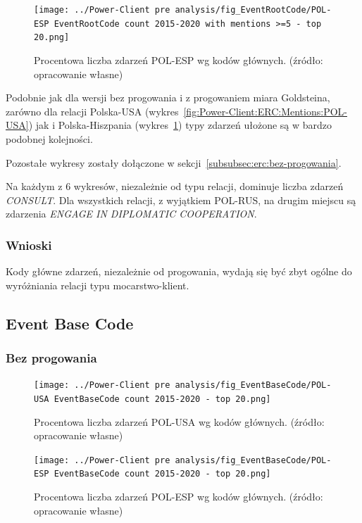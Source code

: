 \documentclass[11pt]{report}
\begin{document}
    \begin{figure}[!htp]
        \centering
        \texttt{[image: ../Power-Client pre analysis/fig\_EventRootCode/POL-ESP EventRootCode count 2015-2020 with mentions >=5 - top 20.png]}
        \caption{Procentowa liczba zdarzeń POL-ESP wg kodów głównych. (źródło: opracowanie własne)}
        \label{fig:Power-Client:ERC:Mentions:POL-ESP}
    \end{figure}

    Podobnie jak dla wersji bez progowania i z progowaniem miara Goldsteina, zarówno dla relacji Polska-USA (wykres~\ref{fig:Power-Client:ERC:Mentions:POL-USA}) jak i Polska-Hiszpania (wykres~\ref{fig:Power-Client:ERC:Mentions:POL-ESP})
    typy zdarzeń ułożone są w bardzo podobnej kolejności.

    Pozostałe wykresy zostały dołączone w sekcji~\ref{subsubsec:erc:bez-progowania}.

    Na każdym z 6 wykresów, niezależnie od typu relacji, dominuje liczba zdarzeń \textit{CONSULT}.
    Dla wszystkich relacji, z wyjątkiem POL-RUS, na drugim miejscu są zdarzenia \textit{ENGAGE IN DIPLOMATIC COOPERATION}.

    \subsubsection{Wnioski}
    Kody główne zdarzeń, niezależnie od progowania, wydają się być zbyt ogólne do wyróżniania relacji typu mocarstwo-klient.

    \subsection{Event Base Code}\label{subsec:event-base-code}

    \subsubsection{Bez progowania}
    \begin{figure}[!htp]
        \centering
        \texttt{[image: ../Power-Client pre analysis/fig\_EventBaseCode/POL-USA EventBaseCode count 2015-2020 - top 20.png]}
        \caption{Procentowa liczba zdarzeń POL-USA wg kodów głównych. (źródło: opracowanie własne)}
        \label{fig:Power-Client:EBC:POL-USA}
    \end{figure}

    \begin{figure}[!htp]
        \centering
        \texttt{[image: ../Power-Client pre analysis/fig\_EventBaseCode/POL-ESP EventBaseCode count 2015-2020 - top 20.png]}
        \caption{Procentowa liczba zdarzeń POL-ESP wg kodów głównych. (źródło: opracowanie własne)}
        \label{fig:Power-Client:EBC:POL-ESP}
    \end{figure}
\end{document}
